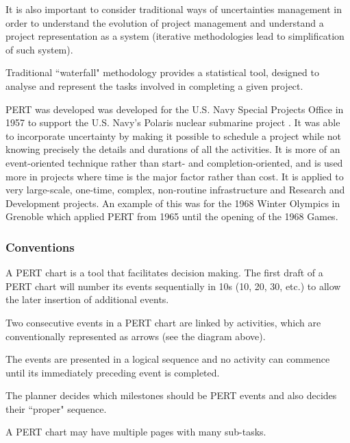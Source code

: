 
It is also important to consider traditional ways of uncertainties management in order to understand the evolution of project management and understand a project representation as a system (iterative methodologies lead to simplification of such system).

Traditional ``waterfall" methodology provides a statistical tool, designed to analyse and represent the tasks involved in completing a given project.

PERT was developed was developed for the U.S. Navy Special Projects Office in 1957 to support the U.S. Navy's Polaris nuclear submarine project \cite{fazar}. It was able to incorporate uncertainty by making it possible to schedule a project while not knowing precisely the details and durations of all the activities. It is more of an event-oriented technique rather than start- and completion-oriented, and is used more in projects where time is the major factor rather than cost. It is applied to very large-scale, one-time, complex, non-routine infrastructure and Research and Development projects. An example of this was for the 1968 Winter Olympics in Grenoble which applied PERT from 1965 until the opening of the 1968 Games.

\subsubsection{Conventions}

\begin{compactitem}
\item A PERT chart is a tool that facilitates decision making. The first draft of a PERT chart will number its events sequentially in 10s (10, 20, 30, etc.) to allow the later insertion of additional events.
\item Two consecutive events in a PERT chart are linked by activities, which are conventionally represented as arrows (see the diagram above).
\item The events are presented in a logical sequence and no activity can commence until its immediately preceding event is completed.
\item The planner decides which milestones should be PERT events and also decides their ``proper" sequence.
\item A PERT chart may have multiple pages with many sub-tasks.
\end{compactitem}

